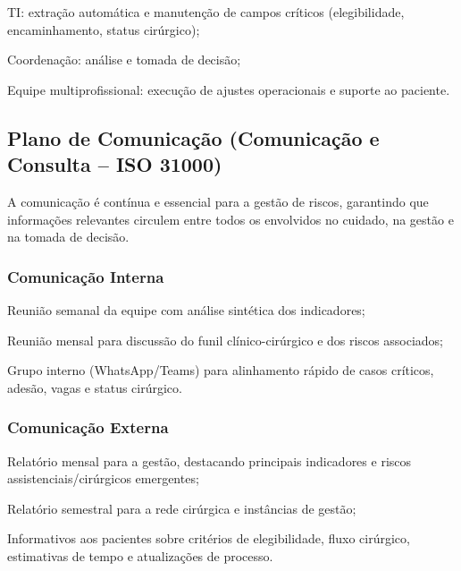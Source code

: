\documentclass[12pt]{article}
\begin{document}
\begin{hlevelthree}
\item TI: extração automática e manutenção de campos críticos (elegibilidade, encaminhamento, status cirúrgico);
\item Coordenação: análise e tomada de decisão;
\item Equipe multiprofissional: execução de ajustes operacionais e suporte ao paciente.
\end{hlevelthree}

\subsection{Plano de Comunicação (Comunicação e Consulta – ISO 31000)}
\label{sec:org0708b3c}
A comunicação é contínua e essencial para a gestão de riscos, garantindo que informações relevantes circulem entre todos os envolvidos no cuidado, na gestão e na tomada de decisão.

\subsubsection{Comunicação Interna}
\label{sec:orga3f247d}

\begin{hlevelthree}
\item Reunião semanal da equipe com análise sintética dos indicadores;
\item Reunião mensal para discussão do funil clínico-cirúrgico e dos riscos associados;
\item Grupo interno (WhatsApp/Teams) para alinhamento rápido de casos críticos, adesão, vagas e status cirúrgico.
\end{hlevelthree}

\subsubsection{Comunicação Externa}
\label{sec:orgf7aef1b}

\begin{hlevelthree}
\item Relatório mensal para a gestão, destacando principais indicadores e riscos assistenciais/cirúrgicos emergentes;
\item Relatório semestral para a rede cirúrgica e instâncias de gestão;
\item Informativos aos pacientes sobre critérios de elegibilidade, fluxo cirúrgico, estimativas de tempo e atualizações de processo.
\end{hlevelthree}
\end{document}
